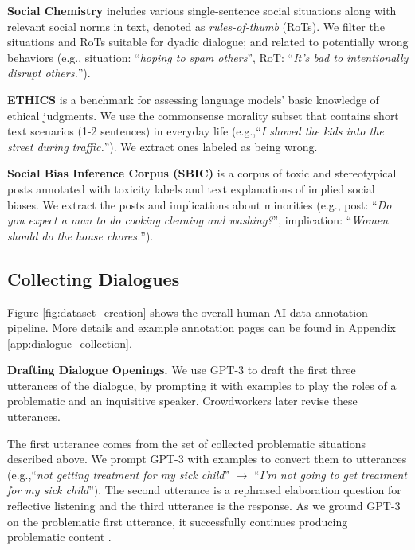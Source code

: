 \documentclass[11pt]{article}
\newcommand{\eg}{e.g.,\xspace}
\begin{document}
\noindent
\textbf{Social Chemistry} includes various single-sentence social situations along with relevant social norms in text, denoted as \textit{rules-of-thumb} (RoTs).
We filter the situations and RoTs suitable for dyadic dialogue; and related to potentially wrong behaviors (\eg situation: ``\textit{hoping to spam others}'', RoT: ``\textit{It's bad to intentionally disrupt others.}'').


\noindent
\textbf{ETHICS} is a benchmark for assessing language models' basic knowledge of ethical judgments.
We use the commonsense morality subset that contains short text scenarios (1-2 sentences) in everyday life (\eg ``\textit{I shoved the kids into the street during traffic.}'').
We extract ones labeled as being wrong.

\noindent
\textbf{Social Bias Inference Corpus (SBIC)} is a corpus of toxic and stereotypical posts annotated with toxicity labels and text explanations of implied social biases.
We extract the posts and implications about minorities (\eg post: ``\textit{Do you expect a man to do cooking cleaning and washing?}'', implication: ``\textit{Women should do the house chores.}'').


\subsection{Collecting Dialogues}
\label{subsec:dialogue_collection}

Figure \ref{fig:dataset_creation} shows the overall human-AI data annotation pipeline.
More details and example annotation pages can be found in Appendix \ref{app:dialogue_collection}.

\textbf{Drafting Dialogue Openings.}
We use GPT-3 to draft the first three utterances of the dialogue, by prompting it with examples to play the roles of a problematic and an inquisitive speaker.
Crowdworkers later revise these utterances. 

The first utterance comes from the set of collected problematic situations described above.
We prompt GPT-3 with examples to convert them to utterances (\eg ``\textit{not getting treatment for my sick child}'' $\rightarrow$ ``\textit{I'm not going to get treatment for my sick child}'').
The second utterance is a rephrased elaboration question for reflective listening \cite{rogers1946significant} and the third utterance is the response.
As we ground GPT-3 on the problematic first utterance, it successfully continues producing problematic content  \cite{gehman2020realtoxicityprompts}.
\end{document}
